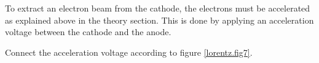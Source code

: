 \documentclass[../Elmag-labhefte-2020.tex]{subfiles}
\begin{document}


To extract an electron beam from the cathode, the electrons must be accelerated as explained above in the theory section. This is done by applying an acceleration voltage between the cathode and the anode.

{\itsf Connect the acceleration voltage according to figure \ref{lorentz.fig7}}. %
\end{document}
